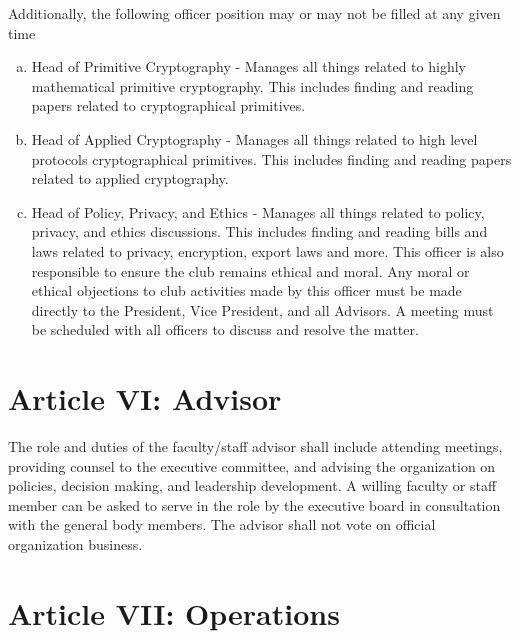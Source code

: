 \documentclass[11pt]{article}
\begin{document}
    Additionally, the following officer position may or may not be filled at any given time

    \begin{enumerate}
        [a)]
        \item Head of Primitive Cryptography - Manages all things related to highly mathematical primitive cryptography.
        This includes finding and reading papers related to cryptographical primitives.
        \item Head of Applied Cryptography - Manages all things related to high level protocols cryptographical primitives.
        This includes finding and reading papers related to applied cryptography.
        \item Head of Policy, Privacy, and Ethics -  Manages all things related to policy, privacy, and ethics discussions.
        This includes finding and reading bills and laws related to privacy, encryption, export laws and more.
        This officer is also responsible to ensure the club remains ethical and moral.
        Any moral or ethical objections to club activities made by this officer must be made directly to the President, Vice President, and all Advisors.
        A meeting must be scheduled with all officers to discuss and resolve the matter.
    \end{enumerate}


    \section{Article VI: Advisor}

    The role and duties of the faculty/staff advisor shall include attending meetings, providing counsel to the executive committee, and advising the organization on policies, decision making, and leadership development.
    A willing faculty or staff member can be asked to serve in the role by the executive board in consultation with the general body members.
    The advisor shall not vote on official organization business.


    \section{Article VII: Operations}
\end{document}
